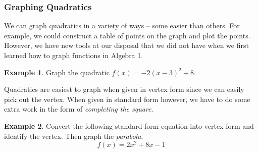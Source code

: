 \documentclass[addpoints,12pt]{exam}
\theoremstyle{definition}
\theoremstyle{break}
\theoremstyle{break}
\newtheorem{example}{Example}[subsection]
\begin{document}
\newpage

\subsubsection*{Graphing Quadratics}
We can graph quadratics in a variety of ways -- some easier than others. For example, we could construct a table of points on the graph and plot the points. However, we have new tools at our disposal that we did not have when we first learned how to graph functions in Algebra 1.
\vspace{.15in}


\begin{example}
Graph the quadratic $f(x) = -2(x-3)^2 + 8$.
\vfill

\begin{figure}[h]
\centering
{}
\end{figure}
\end{example}

\newpage

Quadratics are easiest to graph when given in vertex form since we can easily pick out the vertex. When given in standard form however, we have to do some extra work in the form of \emph{completing the square}.
\vspace{.15in}

\begin{example}
Convert the following standard form equation into vertex form and identify the vertex. Then graph the \emph{parabola}.
\[f(x) = 2x^2 + 8x - 1\]
\vfill

\begin{figure}[h]
\centering
{}
\end{figure}
\end{example}
\end{document}
